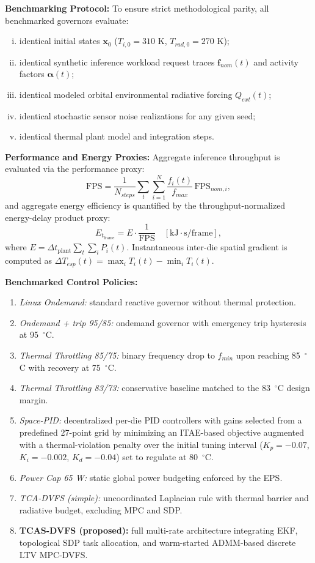 \documentclass[a4paper,fleqn]{cas-dc}
\begin{document}
\textbf{Benchmarking Protocol:}
To ensure strict methodological parity, all benchmarked governors evaluate:
\begin{enumerate}[(i)]
\item identical initial states $\mathbf{x}_0$ ($T_{i,0} = 310\text{ K}$, $T_{rad,0} = 270\text{ K}$);
\item identical synthetic inference workload request traces $\mathbf{f}_{nom}(t)$ and activity factors $\boldsymbol{\alpha}(t)$;
\item identical modeled orbital environmental radiative forcing $Q_{ext}(t)$;
\item identical stochastic sensor noise realizations for any given seed;
\item identical thermal plant model and integration steps.
\end{enumerate}

\textbf{Performance and Energy Proxies:}
Aggregate inference throughput is evaluated via the performance proxy:
\begin{equation}
\mathrm{FPS} = \frac{1}{N_{steps}}\sum_{t} \sum_{i=1}^N \frac{f_i(t)}{f_{max}}\,\mathrm{FPS}_{nom,i},
\end{equation}
and aggregate energy efficiency is quantified by the throughput-normalized energy-delay product proxy:
\begin{equation}
E_{t_{\mathrm{frame}}} = E \cdot \frac{1}{\mathrm{FPS}} \quad [\mathrm{kJ}\cdot\mathrm{s/frame}],
\end{equation}
where $E = \Delta t_{\text{plant}} \sum_t \sum_i P_i(t)$. Instantaneous inter-die spatial gradient is computed as $\Delta T_{esp}(t) = \max_i T_i(t) - \min_i T_i(t)$.

\textbf{Benchmarked Control Policies:}
\begin{enumerate}
\item \textit{Linux Ondemand:} standard reactive governor without thermal protection.
\item \textit{Ondemand + trip 95/85:} ondemand governor with emergency trip hysteresis at 95~$^\circ$C.
\item \textit{Thermal Throttling 85/75:} binary frequency drop to $f_{min}$ upon reaching 85~$^\circ$C with recovery at 75~$^\circ$C.
\item \textit{Thermal Throttling 83/73:} conservative baseline matched to the 83~$^\circ$C design margin.
\item \textit{Space-PID:} decentralized per-die PID controllers with gains selected from a predefined 27-point grid by minimizing an ITAE-based objective augmented with a thermal-violation penalty over the initial tuning interval ($K_p=-0.07$, $K_i=-0.002$, $K_d=-0.04$) set to regulate at 80~$^\circ$C.
\item \textit{Power Cap 65 W:} static global power budgeting enforced by the EPS.
\item \textit{TCA-DVFS (simple):} uncoordinated Laplacian rule with thermal barrier and radiative budget, excluding MPC and SDP.
\item \textbf{TCAS-DVFS (proposed):} full multi-rate architecture integrating EKF, topological SDP task allocation, and warm-started ADMM-based discrete LTV MPC-DVFS.
\end{enumerate}
\end{document}
